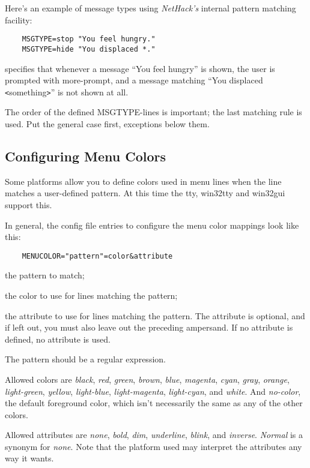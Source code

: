 Here's an example of message types using {\it NetHack's\/} internal
pattern matching facility:

\begin{verbatim}
    MSGTYPE=stop "You feel hungry."
    MSGTYPE=hide "You displaced *."
\end{verbatim}

specifies that whenever a message ``You feel hungry'' is shown,
the user is prompted with more-prompt, and a message matching
``You displaced  \verb+<+something\verb+>+'' is not shown at all.

The order of the defined MSGTYPE-lines is important; the last matching
rule is used. Put the general case first, exceptions below them.


\subsection*{Configuring Menu Colors}

Some platforms allow you to define colors used in menu lines when the
line matches a user-defined pattern. At this time the tty, win32tty and
win32gui support this.

In general, the config file entries to configure the menu color mappings
look like this:
\begin{verbatim}
    MENUCOLOR="pattern"=color&attribute
\end{verbatim}

\blist{}
\item[\ib{pattern}]
the pattern to match;
\item[\ib{color}]
the color to use for lines matching the pattern;
\item[\ib{attribute}]
the attribute to use for lines matching the pattern. The attribute is
optional, and if left out, you must also leave out the preceding ampersand.
If no attribute is defined, no attribute is used.
\elist

The pattern should be a regular expression.

Allowed colors are {\it black}, {\it red}, {\it green}, {\it brown},
{\it blue}, {\it magenta}, {\it cyan}, {\it gray}, {\it orange},
{\it light-green}, {\it yellow}, {\it light-blue}, {\it light-magenta},
{\it light-cyan}, and {\it white}.
And {\it no-color}, the default foreground color, which isn't necessarily
the same as any of the other colors.

Allowed attributes are {\it none}, {\it bold}, {\it dim}, {\it underline},
{\it blink}, and {\it inverse}.
{\it Normal\/} is a synonym for {\it none}.
Note that the platform used may interpret the attributes any way it
wants.

